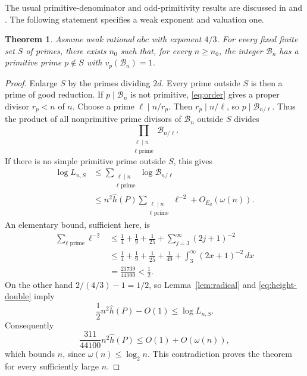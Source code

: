\documentclass[11pt,a4paper]{article}
\newtheorem{theorem}{Theorem}[section]
\begin{document}
The usual primitive-denominator and odd-primitivity results are
discussed in \cite[Lemmas 9 and 13]{Silverman} and
\cite[Proposition 3.10 and the following remarks]{CZ}.
The following statement specifies a weak exponent and valuation one.

\begin{theorem}\label{thm:primitive}
Assume weak rational $abc$ with exponent $4/3$.
For every fixed finite set $S$ of primes, there exists $n_0$ such
that, for every $n\ge n_0$, the integer $\mathcal B_n$ has a primitive prime
$p\notin S$ with $v_p(\mathcal B_n)=1$.
\end{theorem}
\begin{proof}
Enlarge $S$ by the primes dividing $2d$. Every prime outside $S$
is then a prime of good reduction. If $p\mid \mathcal B_n$ is not primitive,
\eqref{eq:order} gives a proper divisor $r_p<n$ of $n$. Choose a
prime $\ell\mid n/r_p$. Then $r_p\mid n/\ell$, so
$p\mid \mathcal B_{n/\ell}$. Thus the product of all nonprimitive prime
divisors of $\mathcal B_n$ outside $S$ divides
\[
 \prod_{\substack{\ell\mid n\\\ell\text{ prime}}}\mathcal B_{n/\ell}.
\]
If there is no simple primitive prime outside $S$, this gives
\begin{align*}
 \log L_{n,S}
 &\le\sum_{\substack{\ell\mid n\\\ell\text{ prime}}}
                                     \log\mathcal B_{n/\ell}\\
 &\le n^2\widehat h(P)
       \sum_{\substack{\ell\mid n\\\ell\text{ prime}}}\ell^{-2}
                                                     +O_{E_d}(\omega(n)).
\end{align*}
An elementary bound, sufficient here, is
\begin{align*}
 \sum_{\ell\text{ prime}}\ell^{-2}
 &\le\frac14+\frac19+\frac1{25}
                    +\sum_{j=3}^{\infty}(2j+1)^{-2}\\
 &\le\frac14+\frac19+\frac1{25}+\frac1{49}
                         +\int_3^{\infty}(2x+1)^{-2}\,dx\\
 &=\frac{21739}{44100}<\frac12.
\end{align*}
On the other hand $2/(4/3)-1=1/2$, so
Lemma~\ref{lem:radical} and \eqref{eq:height-double} imply
\[
 \frac12 n^2\widehat h(P)-O(1)\le\log L_{n,S}.
\]
Consequently
\[
                    \frac{311}{44100}n^2\widehat h(P)
                                       \le O(1)+O(\omega(n)),
\]
which bounds $n$, since $\omega(n)\le\log_2 n$.
This contradiction proves the theorem for every sufficiently large $n$.
\end{proof}
\end{document}
